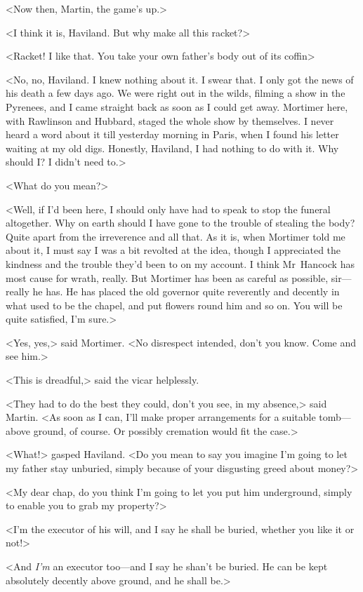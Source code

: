 <Now then, Martin, the game's up.>

<I think it is, Haviland. But why make all this racket?>

<Racket! I like that. You take your own father's body out of its coffin\longdash>

<No, no, Haviland. I knew nothing about it. I swear that. I only got the news of his death a few days ago. We were right out in the wilds, filming a show in the Pyrenees, and I came straight back as soon as I could get away. Mortimer here, with Rawlinson and Hubbard, staged the whole show by themselves. I never heard a word about it till yesterday morning in Paris, when I found his letter waiting at my old digs. Honestly, Haviland, I had nothing to do with it. Why should I\@? I didn't need to.>

<What do you mean?>

<Well, if I'd been here, I should only have had to speak to stop the funeral altogether. Why on earth should I have gone to the trouble of stealing the body? Quite apart from the irreverence and all that. As it is, when Mortimer told me about it, I must say I was a bit revolted at the idea, though I appreciated the kindness and the trouble they'd been to on my account. I think Mr~Hancock has most cause for wrath, really. But Mortimer has been as careful as possible, sir—really he has. He has placed the old governor quite reverently and decently in what used to be the chapel, and put flowers round him and so on. You will be quite satisfied, I'm sure.>

<Yes, yes,> said Mortimer. <No disrespect intended, don't you know. Come and see him.>

<This is dreadful,> said the vicar helplessly.

<They had to do the best they could, don't you see, in my absence,> said Martin. <As soon as I can, I'll make proper arrangements for a suitable tomb—above ground, of course. Or possibly cremation would fit the case.>

<What!> gasped Haviland. <Do you mean to say you imagine I'm going to let my father stay unburied, simply because of your disgusting greed about money?>

<My dear chap, do you think I'm going to let you put him underground, simply to enable you to grab my property?>

<I'm the executor of his will, and I say he shall be buried, whether you like it or not!>

<And \emph{I'm} an executor too—and I say he shan't be buried. He can be kept absolutely decently above ground, and he shall be.>

